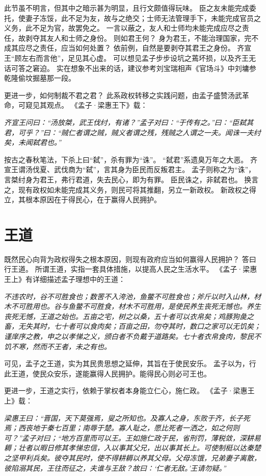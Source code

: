 \documentclass[11pt]{article}
\begin{document}
此节虽不明言，但其中之暗示甚为明显，且行文颇值得玩味。
臣之友未能完成委托，使妻子冻馁，此不足为友，故与之绝交；士师无法管理手下，未能完成官员之义务，此不足为官，故罢免之。
一言以蔽之，友人和士师均未能完成应尽之责任，故剥夺其友人和士师之身份。
则如君王何？
身为君王，不能治理国家，完不成其应尽之责任，应当如何处置？
依前例，自然是要剥夺其君王之身份。
齐宣王“顾左右而言他”，足见其心虚。
可以想见孟子步步设坑之蔫坏损，以及齐王无话可答之窘迫。
实在想象不出来的话，建议参考刘宝瑞相声《官场斗》中刘墉参乾隆偷坟掘墓那一段。

\newline

更进一步，如何制裁不君之君？
此系政权转移之实践问题，由孟子盛赞汤武革命，可窥见其观点。
《孟子·梁惠王下》载：

\textit{齐宣王问曰：“汤放桀，武王伐纣，有诸？”孟子对曰：“于传有之。”曰：“臣弑其君，可乎？”曰：“贼仁者谓之贼，贼义者谓之残，残贼之人谓之一夫。闻诛一夫纣矣，未闻弑君也。”}

按古之春秋笔法，下杀上曰“弑”，杀有罪为“诛”。
“弑君”系遗臭万年之大恶。
齐宣王谓汤伐夏、武伐商为“弑”，言其身为臣民而反叛君主。
孟子则称之为“诛”，言桀纣身为君王，弗行君道，失去民心，即为有罪。
臣民诛之，非弑君也。
换言之，现有政权如未能完成其义务，则民可将其推翻，另立一新政权。
新政权之得立，其根本原因在于得民心，在于赢得人民拥护。
  
\section{王道}
既然民心向背为政权得失之根本原因，则现有政府应当如何赢得人民拥护？
答曰行王道。
所谓王道，实指一套具体措施，以提高人民之生活水平。
《孟子·梁惠王上》有详细描述孟子理想中的王道：
  
\textit{不违农时，谷不可胜食也；数罟不入洿池，鱼鳖不可胜食也；斧斤以时入山林，材木不可胜用也。谷与鱼鳖不可胜食，材木不可胜用，是使民养生丧死无憾也。养生丧死无憾，王道之始也。五亩之宅，树之以桑，五十者可以衣帛矣；鸡豚狗彘之畜，无失其时，七十者可以食肉矣；百亩之田，勿夺其时，数口之家可以无饥矣；谨庠序之教，申之以孝悌之义，颁白者不负戴于道路矣。七十者衣帛食肉，黎民不饥不寒，然而不王者，未之有也。}

可见，孟子之王道，实为其民贵思想之延伸，其旨在于使民安乐。
孟子以为，行此王道，使民众安乐，遂能赢得人民拥护。能得民心则必可王也。

\newline

更进一步，王道之实行，依赖于掌权者本身能立仁心，施仁政。
《孟子·梁惠王上》载：

\textit{梁惠王曰：“晋国，天下莫强焉，叟之所知也。及寡人之身，东败于齐，长子死焉；西丧地于秦七百里；南辱于楚。寡人耻之，愿比死者一洒之，如之何则可？”孟子对曰；“地方百里而可以王。王如施仁政于民，省刑罚，薄税敛，深耕易耨；壮者以暇日修其孝悌忠信，入以事其父兄，出以事其长上。可使制梃以达秦楚之坚甲利兵矣。彼夺其民时，使不得耕耨以养其父母。父母冻饿，兄弟妻子离散，彼陷溺其民，王往而征之，夫谁与王敌？故曰：‘仁者无敌。’王请勿疑。”}
\end{document}
